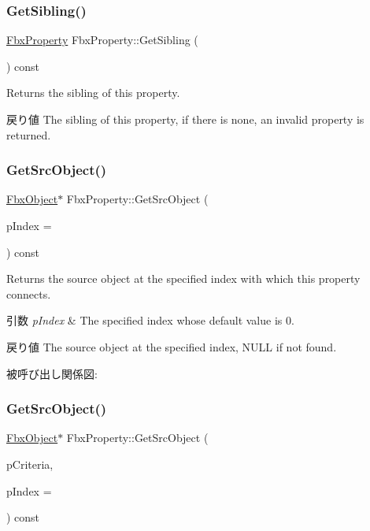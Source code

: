 \subsubsection{\texorpdfstring{Get\+Sibling()}{GetSibling()}}
{\footnotesize\ttfamily \hyperlink{class_fbx_property}{Fbx\+Property} Fbx\+Property\+::\+Get\+Sibling (\begin{DoxyParamCaption}{ }\end{DoxyParamCaption}) const}

Returns the sibling of this property. \begin{DoxyReturn}{戻り値}
The sibling of this property, if there is none, an invalid property is returned. 
\end{DoxyReturn}
\mbox{\label{class_fbx_property_ade290835b0d88b978bc2566e255c5974}} 
\subsubsection{\texorpdfstring{Get\+Src\+Object()}{GetSrcObject()}\hspace{0.1cm}{\footnotesize\ttfamily [1/4]}}
{\footnotesize\ttfamily \hyperlink{class_fbx_object}{Fbx\+Object}$\ast$ Fbx\+Property\+::\+Get\+Src\+Object (\begin{DoxyParamCaption}\item[{const int}]{p\+Index = {} }\end{DoxyParamCaption}) const}

Returns the source object at the specified index with which this property connects. 
\begin{DoxyParams}{引数}
{\em p\+Index} & The specified index whose default value is 0. \\
\hline
\end{DoxyParams}
\begin{DoxyReturn}{戻り値}
The source object at the specified index, N\+U\+LL if not found. 
\end{DoxyReturn}
被呼び出し関係図\+:
\mbox{\label{class_fbx_property_ab7e0cadde56df774a9a52e24be2bcec9}} 
\subsubsection{\texorpdfstring{Get\+Src\+Object()}{GetSrcObject()}\hspace{0.1cm}{\footnotesize\ttfamily [2/4]}}
{\footnotesize\ttfamily \hyperlink{class_fbx_object}{Fbx\+Object}$\ast$ Fbx\+Property\+::\+Get\+Src\+Object (\begin{DoxyParamCaption}\item[{const \hyperlink{class_fbx_criteria}{Fbx\+Criteria} \&}]{p\+Criteria,  }\item[{const int}]{p\+Index = {} }\end{DoxyParamCaption}) const}


